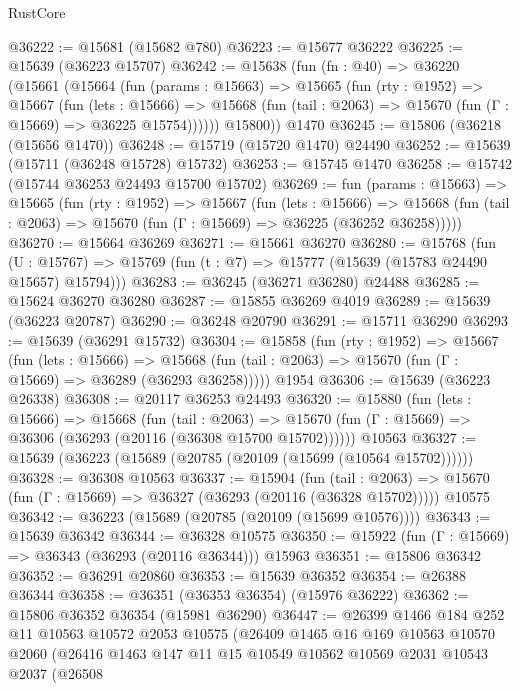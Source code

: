 \begin{lexlean}{RustCore}
\begin{coremodule}
@36222 := @15681 (@15682 @780)
@36223 := @15677 @36222
@36225 := @15639 (@36223 @15707)
@36242 := @15638
    (fun (fn : @40) =>
    @36220
      (@15661
        (@15664
          (fun (params : @15663) =>
          @15665
            (fun (rty : @1952) =>
            @15667
              (fun (lets : @15666) =>
              @15668 (fun (tail : @2063) => @15670 (fun (Γ : @15669) => @36225 @15754))))))
        @15800))
    @1470
@36245 := @15806 (@36218 (@15656 @1470))
@36248 := @15719 (@15720 @1470) @24490
@36252 := @15639 (@15711 (@36248 @15728) @15732)
@36253 := @15745 @1470
@36258 := @15742 (@15744 @36253 @24493 @15700 @15702)
@36269 := fun (params : @15663) =>
  @15665
    (fun (rty : @1952) =>
    @15667
      (fun (lets : @15666) =>
      @15668 (fun (tail : @2063) => @15670 (fun (Γ : @15669) => @36225 (@36252 @36258)))))
@36270 := @15664 @36269
@36271 := @15661 @36270
@36280 := @15768
    (fun (U : @15767) => @15769 (fun (t : @7) => @15777 (@15639 (@15783 @24490 @15657) @15794)))
@36283 := @36245 (@36271 @36280) @24488
@36285 := @15624 @36270 @36280
@36287 := @15855 @36269 @4019
@36289 := @15639 (@36223 @20787)
@36290 := @36248 @20790
@36291 := @15711 @36290
@36293 := @15639 (@36291 @15732)
@36304 := @15858
    (fun (rty : @1952) =>
    @15667
      (fun (lets : @15666) =>
      @15668 (fun (tail : @2063) => @15670 (fun (Γ : @15669) => @36289 (@36293 @36258)))))
    @1954
@36306 := @15639 (@36223 @26338)
@36308 := @20117 @36253 @24493
@36320 := @15880
    (fun (lets : @15666) =>
    @15668
      (fun (tail : @2063) =>
      @15670 (fun (Γ : @15669) => @36306 (@36293 (@20116 (@36308 @15700 @15702))))))
    @10563
@36327 := @15639 (@36223 (@15689 (@20785 (@20109 (@15699 (@10564 @15702))))))
@36328 := @36308 @10563
@36337 := @15904
    (fun (tail : @2063) => @15670 (fun (Γ : @15669) => @36327 (@36293 (@20116 (@36328 @15702)))))
    @10575
@36342 := @36223 (@15689 (@20785 (@20109 (@15699 @10576))))
@36343 := @15639 @36342
@36344 := @36328 @10575
@36350 := @15922 (fun (Γ : @15669) => @36343 (@36293 (@20116 @36344))) @15963
@36351 := @15806 @36342
@36352 := @36291 @20860
@36353 := @15639 @36352
@36354 := @26388 @36344
@36358 := @36351 (@36353 @36354) (@15976 @36222)
@36362 := @15806 @36352 @36354 (@15981 @36290)
@36447 := @26399
    @1466
    @184
    @252
    @11
    @10563
    @10572
    @2053
    @10575
    (@26409
      @1465
      @16
      @169
      @10563
      @10570
      @2060
      (@26416
        @1463
        @147
        @11
        @15
        @10549
        @10562
        @10569
        @2031
        @10543
        @2037
        (@26508

\end{coremodule}
\end{lexlean}
